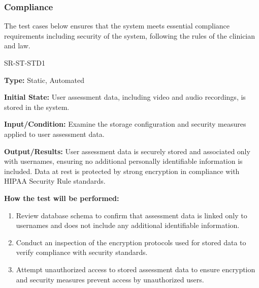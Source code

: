 \documentclass[12pt, titlepage]{article}
\begin{document}
\subsubsection{Compliance}

The test cases below ensures that the system meets essential 
compliance requirements including security of the system, following the rules of the clinician and law.
		
\begin{itemize}
  \begin{item}
    SR-ST-STD1
    \begin{mdframed}[linewidth=0.5mm]
      \textbf{Type:} Static, Automated \par
      \textbf{Initial State:} User assessment data, including video and audio recordings, is stored in the system. \par
      \textbf{Input/Condition:} Examine the storage configuration and security measures applied to user assessment data. \par
      \textbf{Output/Results:} User assessment data is securely stored and associated only with usernames, 
      ensuring no additional personally identifiable information is \\ included. Data at rest is protected by strong encryption 
      in compliance with HIPAA Security Rule standards. \par
      \textbf{How the test will be performed:}
      \begin{enumerate}[noitemsep]
        \item Review database schema to confirm that assessment data is linked only to usernames and does not
         include any additional identifiable information.
        \item Conduct an inspection of the encryption protocols used for stored data to verify compliance with
         security standards.
        \item Attempt unauthorized access to stored assessment data to ensure encryption and security measures
         prevent access by unauthorized users.
      \end{enumerate}
    \end{mdframed}
  \end{item}
\end{itemize}
\end{document}
